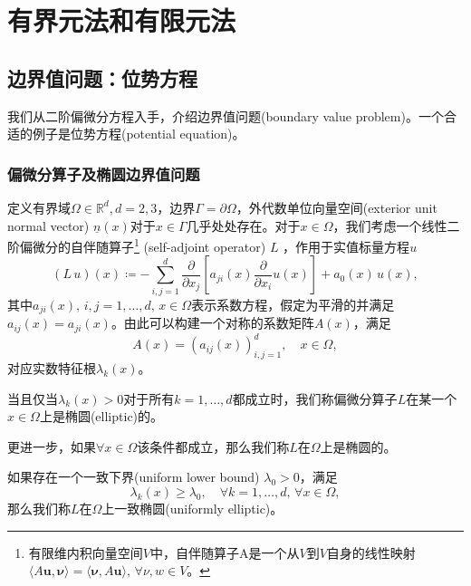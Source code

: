 \chapter{有界元法和有限元法}
\label{sec:bem-fem-methods}

\section{边界值问题：位势方程}
\label{sec:bem-fem-potential-bvp}
我们从二阶偏微分方程入手，介绍边界值问题(boundary value problem)。一个合适的例子是位势方程(potential equation)。

\subsection{偏微分算子及椭圆边界值问题}

定义有界域$\Omega \in \mathbb{R}^d, d=2,3$，边界$\Gamma = \partial \Omega$，外代数单位向量空间(exterior unit normal vector) $\underline{n}(x)$对于$x \in \Gamma$几乎处处存在。对于$x \in \Omega$，我们考虑一个线性二阶偏微分的自伴随算子\footnote{有限维内积向量空间$V$中，自伴随算子A是一个从$V$到$V$自身的线性映射$\langle A \bm{u}, \bm{\nu} \rangle = \langle \bm{\nu}, A \bm{u} \rangle, \, \forall \nu, w \in V$。}
(self-adjoint operator) $L$
，作用于实值标量方程$u$
\begin{equation}
  \label{eq:bvp-self-adjoint-pde-operator}
  \left( L \, u \right)(x) \coloneqq - \sum_{i,j=1}^d \frac{\partial}{\partial x_j} \left[ a_{ji} (x) \frac{\partial}{\partial x_i} u(x)\right] + a_0(x)\, u(x),
\end{equation}
其中$a_{ji}(x), \, i,j =1,\ldots, d, \, x \in \Omega$表示系数方程，假定为平滑的并满足$a_{ij}(x) = a_{ji}(x)$。由此可以构建一个对称的系数矩阵$A(x)$，满足
\begin{equation*}
  A(x) = \left( a_{ij}(x) \right)_{i,j=1}^{d}, \quad x \in \Omega,
\end{equation*}
对应实数特征根$\lambda_{k}(x)$。

当且仅当$\lambda_{k}(x) > 0$对于所有$k=1,\ldots,d$都成立时，我们称偏微分算子$L$在某一个$x \in \Omega$上是椭圆(elliptic)的。

更进一步，如果$\forall x \in \Omega$该条件都成立，那么我们称$L$在$\Omega$上是椭圆的。

如果存在一个一致下界(uniform lower bound) $\lambda_0 > 0$，满足
\begin{equation}
  \label{eq:bvp-def-uniformly-elliptic}
  \lambda_k (x) \ge \lambda_0, \quad \forall k = 1,\ldots,d, \, \forall x \in \Omega,
\end{equation}
那么我们称$L$在$\Omega$上一致椭圆(uniformly elliptic)。

